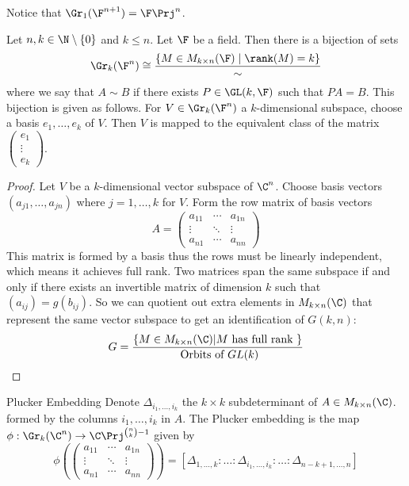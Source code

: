 \documentclass[a4paper]{article}
\begin{document}
Notice that $\Gr_1(\F^{n+1})=\F\Prj^n$. 

\begin{lmm}{}{} Let $n,k\in\N\setminus\{0\}$ and $k\leq n$. Let $\F$ be a field. Then there is a bijection of sets $$\Gr_k(\F^n)\cong\frac{\{M\in M_{k\times n}(\F)\;|\;\rank(M)=k\}}{\sim}$$ where we say that $A\sim B$ if there exists $P\in\GL(k,\F)$ such that $PA=B$. This bijection is given as follows. For $V\in\Gr_k(\F^n)$ a $k$-dimensional subspace, choose a basis $e_1,\dots,e_k$ of $V$. Then $V$ is mapped to the equivalent class of the matrix $\begin{pmatrix}
e_1\\\vdots\\e_k
\end{pmatrix}$. \tcbline
\begin{proof}
Let $V$ be a $k$-dimensional vector subspace of $\C^n$. Choose basis vectors $(a_{j1},\dots,a_{jn})$ where $j=1,\dots,k$ for $V$. Form the row matrix of basis vectors $$A=\begin{pmatrix}a_{11} & \cdots & a_{1n}\\\vdots & \ddots & \vdots\\ a_{n1} & \cdots & a_{nn}\end{pmatrix}$$
This matrix is formed by a basis thus the rows must be linearly independent, which means it achieves full rank. Two matrices span the same subspace if and only if there exists an invertible matrix of dimension $k$ such that $(a_{ij})=g(b_{ij})$. So we can quotient out extra elements in $M_{k\times n}(\C)$ that represent the same vector subspace to get an identification of $G(k,n)$: $$G=\frac{\{M\in M_{k\times n}(\C)|M\text{ has full rank }\}}{\text{ Orbits of }GL(k)}$$ 
\end{proof}
\end{lmm}

\begin{defn}{Plucker Embedding}{} Denote $\Delta_{i_1,\dots,i_k}$ the $k\times k$ subdeterminant of $A\in M_{k\times n}(\C)$. formed by the columns $i_1,\dots,i_k$ in $A$. The Plucker embedding is the map $\phi:\Gr_k(\C^n)\to\C\Prj^{\binom{n}{k}-1}$ given by $$\phi\left(\begin{pmatrix}a_{11} & \cdots & a_{1n}\\\vdots & \ddots & \vdots\\ a_{n1} & \cdots & a_{nn}\end{pmatrix}\right)=[\Delta_{1,\dots,k}:\dots:\Delta_{i_1,\dots,i_k}:\dots:\Delta_{n-k+1,\dots,n}]$$ 
\end{defn}
\end{document}
